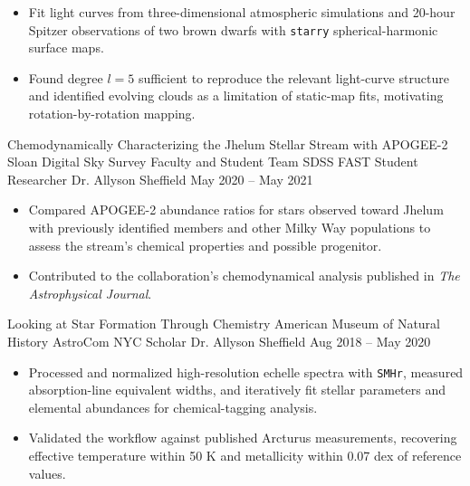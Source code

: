 \begin{itemize}[
  leftmargin=1em,
  label={--},
  itemsep=3pt,
  topsep=0pt,
  parsep=0pt,
  partopsep=0pt
]

\item Fit light curves from three-dimensional atmospheric simulations and
20-hour Spitzer observations of two brown dwarfs with \texttt{starry}
spherical-harmonic surface maps.

\item Found degree $l=5$ sufficient to reproduce the relevant light-curve
structure and identified evolving clouds as a limitation of static-map fits,
motivating rotation-by-rotation mapping.

\end{itemize}

\vspace{0.4em}

\researchentry
  {Chemodynamically Characterizing the Jhelum Stellar Stream with APOGEE-2}
  {Sloan Digital Sky Survey Faculty and Student Team}
  {SDSS FAST Student Researcher}
  {Dr. Allyson Sheffield}
  {May 2020 -- May 2021}
  {%
    \hspace{0.15em}
  }

\begin{itemize}[
  leftmargin=1em,
  label={--},
  itemsep=3pt,
  topsep=0pt,
  parsep=0pt,
  partopsep=0pt
]
\item Compared APOGEE-2 abundance ratios for stars observed toward Jhelum
with previously identified members and other Milky Way populations to assess
the stream's chemical properties and possible progenitor.

\item Contributed to the collaboration's chemodynamical analysis published in
\textit{The Astrophysical Journal}.
\end{itemize}

\vspace{0.4em}

\researchentry
  {Looking at Star Formation Through Chemistry}
  {American Museum of Natural History}
  {AstroCom NYC Scholar}
  {Dr. Allyson Sheffield}
  {Aug 2018 -- May 2020}
  {}

\begin{itemize}[
  leftmargin=1em,
  label={--},
  itemsep=3pt,
  topsep=0pt,
  parsep=0pt,
  partopsep=0pt
]
\item Processed and normalized high-resolution echelle spectra with
\texttt{SMHr}, measured absorption-line equivalent widths, and iteratively
fit stellar parameters and elemental abundances for chemical-tagging analysis.

\item Validated the workflow against published Arcturus measurements,
recovering effective temperature within 50 K and metallicity within 0.07 dex
of reference values.
\end{itemize}

